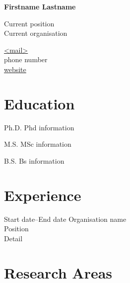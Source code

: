 \documentclass[12pt,letterpaper]{report}
\newcommand{\myname}{Firstname Lastname}
\newcommand{\namefont}[1]{{\normalfont\bfseries\Huge{#1}}}
\begin{document}
    \raggedright{}

    \namefont{\myname}

    \vspace{1em}
    \begin{minipage}[t]{0.700\textwidth}
        Current position \\
        Current organisation
    \end{minipage}
    \begin{minipage}[t]{0.295\textwidth}
        \flushright{}
        \href{mailto:<mail>}{<mail>} \\
        phone number \\
        \href{https://website}{website}
    \end{minipage}


    \section*{Education}

    \begin{tablist}

        \item[Ph.D.] \tab{}Phd information
        \item[M.S.]  \tab{}MSc information
        \item[B.S.]  \tab{}Bs information

    \end{tablist}



    \section*{Experience}

    \begin{tablist}

        \item[Start date--End date]   \tab{}Organisation name \\
                              Position \\
                              Detail

    \end{tablist}



    \section*{Research Areas}
\end{document}

